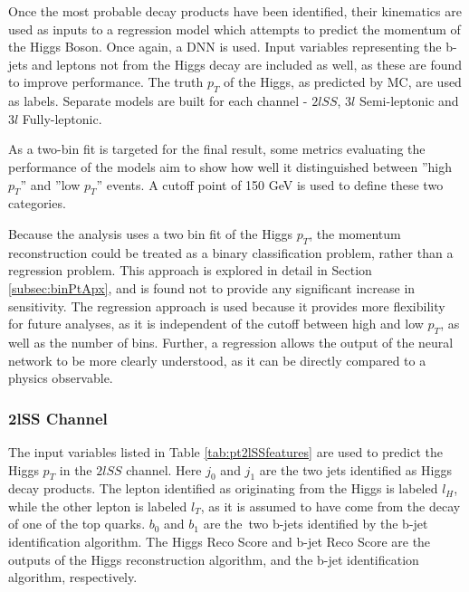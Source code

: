 Once the most probable decay products have been identified, their kinematics are used as inputs to a regression model which attempts to predict the momentum of the Higgs Boson. Once again, a DNN is used. Input variables representing the b-jets and leptons not from the Higgs decay are included as well, as these are found to improve performance. The truth $p_T$ of the Higgs, as predicted by MC, are used as labels. Separate models are built for each channel - $2lSS$, $3l$  Semi-leptonic and $3l$  Fully-leptonic.

As a two-bin fit is targeted for the final result, some metrics evaluating the performance of the models aim to show how well it distinguished between ''high $p_T$'' and ''low $p_T$'' events. A cutoff point of 150 GeV is used to define these two categories.

Because the analysis uses a two bin fit of the Higgs $p_T$, the momentum reconstruction could be treated as a binary classification problem, rather than a regression problem. This approach is explored in detail in Section \ref{subsec:binPtApx}, and is found not to provide any significant increase in sensitivity. The regression approach is used because it provides more flexibility for future analyses, as it is independent of the cutoff between high and low $p_T$, as well as the number of bins. Further, a regression allows the output of the neural network to be more clearly understood, as it can be directly compared to a physics observable.

\subsubsection{2lSS Channel}
\label{subsec:pt2lSS}                                                                                                      

The input variables listed in Table \ref{tab:pt2lSSfeatures} are used to predict the Higgs $p_T$ in the $2lSS$ channel. Here $j_0$ and $j_1$ are the two jets identified as Higgs decay products. The lepton identified as originating from the Higgs is labeled $l_H$, while the other lepton is labeled $l_T$, as it is assumed to have come from the decay of one of the top quarks. $b_0$ and $b_1$ are the\ two b-jets identified by the b-jet identification algorithm. The Higgs Reco Score and b-jet Reco Score are the outputs of the Higgs reconstruction algorithm, and the b-jet identification algorithm, respectively.

